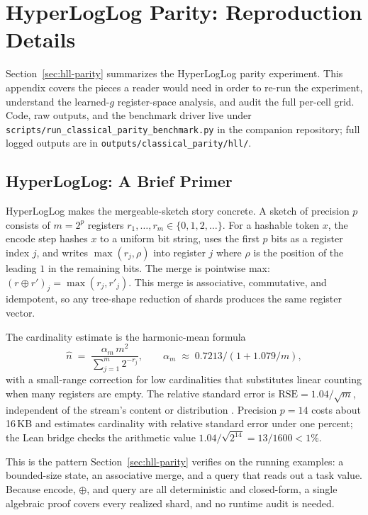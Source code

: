 \section{HyperLogLog Parity: Reproduction Details}\label{app:classical-parity}

Section~\ref{sec:hll-parity} summarizes the HyperLogLog parity
experiment. This appendix covers the pieces a reader would need in
order to re-run the experiment, understand the learned-$g$
register-space analysis, and audit the full per-cell grid. Code, raw
outputs, and the benchmark driver live under
\texttt{scripts/run\_classical\_parity\_benchmark.py} in the companion
repository; full logged outputs are in \texttt{outputs/classical\_parity/hll/}.

\subsection{HyperLogLog: A Brief Primer}\label{app:hll-primer}

HyperLogLog makes the mergeable-sketch story concrete. A sketch of
precision $p$ consists of $m = 2^p$ registers $r_1, \ldots, r_m \in
\{0, 1, 2, \ldots\}$. For a hashable token $x$, the encode step hashes
$x$ to a uniform bit string, uses the first $p$ bits as a register
index $j$, and writes $\max(r_j, \rho)$ into register $j$ where $\rho$
is the position of the leading $1$ in the remaining bits. The merge
is pointwise max: $(r \oplus r')_j = \max(r_j, r'_j)$. This merge is
associative, commutative, and idempotent, so any tree-shape reduction
of shards produces the same register vector.

The cardinality estimate is the harmonic-mean formula
\[
\hat n \;=\; \frac{\alpha_m \, m^2}{\sum_{j=1}^m 2^{-r_j}},
\qquad
\alpha_m \;\approx\; 0.7213 / (1 + 1.079/m),
\]
with a small-range correction for low cardinalities that substitutes
linear counting when many registers are empty. The relative standard
error is $\mathrm{RSE} = 1.04/\sqrt{m}$, independent of the stream's
content or distribution \citep{FlajoletEtAl2007}. Precision $p=14$
costs about 16\,KB and estimates cardinality with relative standard
error under one percent; the Lean bridge checks the arithmetic value
$1.04/\sqrt{2^{14}}=13/1600<1\%$.

This is the pattern Section~\ref{sec:hll-parity} verifies on the
running examples: a bounded-size state, an associative merge, and a
query that reads out a task value. Because $\mathrm{encode}$,
$\oplus$, and $\mathrm{query}$ are all deterministic and closed-form,
a single algebraic proof covers every realized shard, and no runtime
audit is needed.

